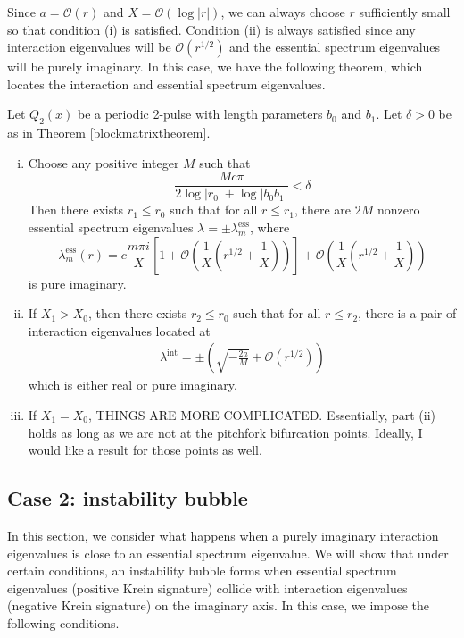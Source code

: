 \documentclass[thesis.tex]{subfiles}
\begin{document}
Since $a = \mathcal{O}(r)$ and $X = \mathcal{O}(\log|r|)$, we can always choose $r$ sufficiently small so that condition (i) is satisfied. Condition (ii) is always satisfied since any interaction eigenvalues will be $\mathcal{O}(r^{1/2})$ and the essential spectrum eigenvalues will be purely imaginary. In this case, we have the following theorem, which locates the interaction and essential spectrum eigenvalues.

\begin{theorem}\label{theorem:2peigscase1}
Let $Q_2(x)$ be a periodic 2-pulse with length parameters $b_0$ and $b_1$. Let $\delta > 0$ be as in Theorem \ref{blockmatrixtheorem}. 
\begin{enumerate}[(i)]
\item Choose any positive integer $M$ such that
\[
\frac{M c \pi}{2 \log|r_0| + \log|b_0 b_1| } < \delta
\]
Then there exists $r_1 \leq r_0$ such that for all $r\leq r_1$, there are $2M$ nonzero essential spectrum eigenvalues $\lambda = \pm \lambda_m^{\text{ess}}$, where
\[
\lambda_m^{\text{ess}}(r) = c \frac{m \pi i}{X}\left[1 + \mathcal{O}\left( \frac{1}{X}\left( r^{1/2} + \frac{1}{X} \right) \right) \right] + \mathcal{O}\left( \frac{1}{X}\left( r^{1/2} + \frac{1}{X} \right) \right)
\]
is pure imaginary.

\item If $X_1 > X_0$, then there exists $r_2 \leq r_0$ such that for all $r \leq r_2$, there is a pair of interaction eigenvalues located at
\begin{align*}
\lambda^{\text{int}} = \pm \left( \sqrt{-\frac{2 a}{M}} + \mathcal{O}( r^{1/2} ) \right)
\end{align*}
which is either real or pure imaginary.

\item If $X_1 = X_0$, THINGS ARE MORE COMPLICATED. Essentially, part (ii) holds as long as we are not at the pitchfork bifurcation points. Ideally, I would like a result for those points as well.

\end{enumerate}
\end{theorem}

\subsection{Case 2: instability bubble}

In this section, we consider what happens when a purely imaginary interaction eigenvalues is close to an essential spectrum eigenvalue. We will show that under certain conditions, an instability bubble forms when essential spectrum eigenvalues (positive Krein signature) collide with interaction eigenvalues (negative Krein signature) on the imaginary axis. In this case, we impose the following conditions.
\end{document}

